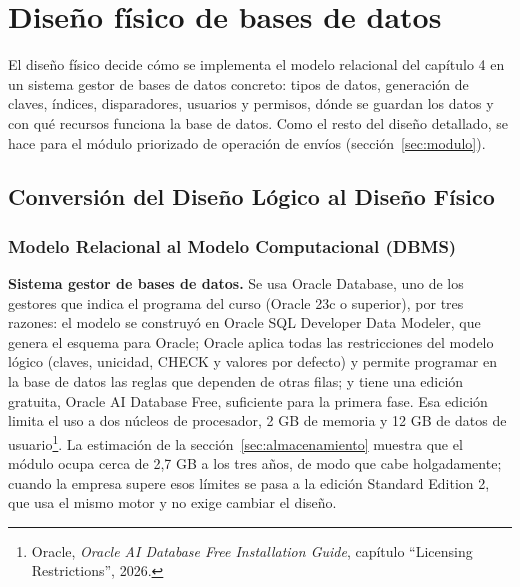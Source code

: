 
\section{Diseño físico de bases de datos}

El diseño físico decide cómo se implementa el modelo relacional del
capítulo 4 en un sistema gestor de bases de datos concreto: tipos de
datos, generación de claves, índices, disparadores, usuarios y
permisos, dónde se guardan los datos y con qué recursos funciona la base
de datos. Como el resto del diseño detallado, se hace para el módulo
priorizado de operación de envíos (sección~\ref{sec:modulo}).

\subsection{Conversión del Diseño Lógico al Diseño Físico}

\subsubsection{Modelo Relacional al Modelo Computacional (DBMS)}

\textbf{Sistema gestor de bases de datos.} Se usa Oracle Database,
uno de los gestores que indica el programa del curso (Oracle 23c o
superior), por tres razones: el modelo se construyó en Oracle SQL
Developer Data Modeler, que genera el esquema para Oracle; Oracle aplica todas las
restricciones del modelo lógico (claves, unicidad, CHECK y valores por
defecto) y permite programar en la base de datos las reglas que
dependen de otras filas; y tiene una edición gratuita, Oracle AI
Database Free, suficiente para la primera fase. Esa edición limita el
uso a dos núcleos de procesador, 2 GB de memoria y 12 GB de datos de
usuario\footnote{Oracle, \textit{Oracle AI Database Free Installation
Guide}, capítulo ``Licensing Restrictions'', 2026.}. La estimación de
la sección~\ref{sec:almacenamiento} muestra que el módulo ocupa cerca de
2,7 GB a los tres años, de modo que cabe holgadamente; cuando la
empresa supere esos límites se pasa a la edición Standard Edition 2,
que usa el mismo motor y no exige cambiar el diseño.

